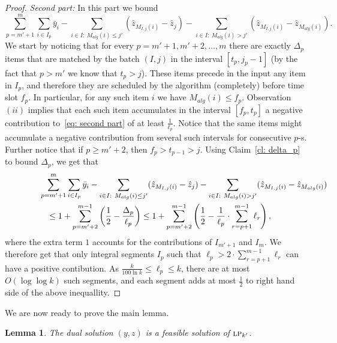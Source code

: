 \documentclass[12pt]{article}
\newtheorem{lemma}[theorem]{Lemma}
\newcommand{\LP}{{\hbox{\sc lp}}}
\begin{document}
\begin{proof}
{\em Second part:}\/ In this part we bound
\begin{equation}\label{eq: second part}
\sum_{p=m'+1}^m\sum_{i\in I_p} \bar{y}_{i} -
\sum_{i\in I:\ M_{alg}(i) \le j'} (\hat{z}_{M_{I,j}(i)} - \hat{z}_j) -
\sum_{i\in I:\ M_{alg}(i) > j'} (\hat{z}_{M_{I,j}(i)} - \hat{z}_{M_{alg}(i)}).
\end{equation}
We start by noticing that for every $p=m'+1,m'+2,\dots,m$
there are exactly $\Delta_p$ items that are matched by the
batch $(I,j)$ in the interval $[t_p,j_p-1]$ (by the fact that $p > m'$
we know that $t_p > j$). These items precede
in the input any item in $I_p$, and therefore they are
scheduled by the algorithm (completely) before time slot $f_p$.
In particular, for any such item $i$ we have $M_{alg}(i)\le f_p$.
Observation $(ii)$ implies that each such item accumulates
in the interval $[f_p,t_p]$ a negative contribution to~\eqref{eq: second part}
of at least $\frac{1}{\ell_p}$. Notice that the same items might
accumulate a negative contribution from several such intervals
for consecutive $p$-s. Further notice that if $p\ge m'+2$, then
$f_p > t_{p-1} > j$.
Using Claim~\ref{cl: delta_p} to bound $\Delta_p$, we get that
\begin{eqnarray*}
\lefteqn{\sum_{p=m'+1}^m\sum_{i\in I_p} \bar{y}_{i} -
\sum_{i\in I:\ M_{alg}(i) \le j'} (\hat{z}_{M_{I,j}(i)} - \hat{z}_j) -
\sum_{i\in I:\ M_{alg}(i) > j'} (\hat{z}_{M_{I,j}(i)} - \hat{z}_{M_{alg}(i)})}\\
&&\le 1 +  \sum_{p=m'+2}^{m-1}\left( \frac{1}{2}-\frac{\Delta_p}{\ell_p}\right)
\le 1 + \sum_{p=m'+2}^{m-1} \left(\frac{1}{2}-
\frac{1}{\ell_p}\cdot\sum_{r=p+1}^{m-1}\ell_r \right),
\end{eqnarray*}
where the extra term $1$ accounts for the contributions of $I_{m'+1}$ and $I_m$.
We therefore get that only integral segments $I_p$ such that
$\ell_p > 2\cdot \sum_{r=p+1}^{m-1}\ell_r$ can have 
a positive contibution. As $\frac{k}{100\ln k}\le \ell_p \le k$,
there are at most $O(\log \log k)$ such segments, and each
segment adds at most $\frac 1 2$ to right hand side of the above
inequallity.
\end{proof}

We are now ready to prove the main lemma.
\begin{lemma}\label{lm: (y,z) feasible}
The dual solution $(y,z)$ is a feasible solution of $\LP_{k'}$.
\end{lemma}
\end{document}
